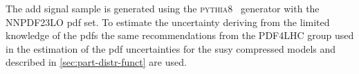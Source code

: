 

The \gls{add} signal sample is generated using the
\textsc{pythia8}~\cite{PYTHIA8} generator with the NNPDF23LO \gls{pdf} set. To
estimate the uncertainty deriving from the limited knowledge of the \glspl{pdf}
the same recommendations from the PDF4LHC group used in the estimation of the
\gls{pdf} uncertainties for the \gls{susy} compressed models and described in
\cref{sec:part-distr-funct} are used.

